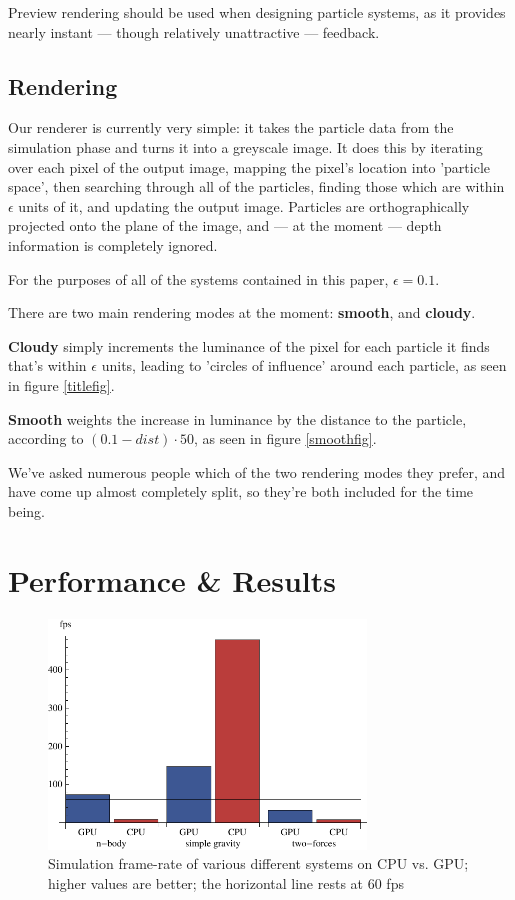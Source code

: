 \documentclass{acmsiggraph}
\begin{document}
Preview rendering should be used when designing particle systems, as it provides nearly instant --- though relatively unattractive --- feedback.

\subsection{Rendering}

Our renderer is currently very simple: it takes the particle data from the simulation phase and turns it into a greyscale image. It does this by iterating over each pixel of the output image, mapping the pixel's location into 'particle space', then searching through all of the particles, finding those which are within $\epsilon$ units of it, and updating the output image. Particles are orthographically projected onto the plane of the image, and --- at the moment --- depth information is completely ignored.

For the purposes of all of the systems contained in this paper, $\epsilon=0.1$.

There are two main rendering modes at the moment: {\bf smooth}, and {\bf cloudy}.

{\bf Cloudy} simply increments the luminance of the pixel for each particle it finds that's within $\epsilon$ units, leading to 'circles of influence' around each particle, as seen in figure \ref{titlefig}.

{\bf Smooth} weights the increase in luminance by the distance to the particle, according to $(0.1 - dist) \cdot 50$, as seen in figure \ref{smoothfig}.

We've asked numerous people which of the two rendering modes they prefer, and have come up almost completely split, so they're both included for the time being.

\section{Performance \& Results}

\label{performanceSection}

\begin{figure}
    \includegraphics[width=84.5mm]{basicSpeedPlot.pdf}
    \caption{Simulation frame-rate of various different systems on CPU vs. GPU; higher values are better; the horizontal line rests at 60 fps}
    \label{fig:basicSpeedPlot}
\end{figure}
\end{document}
